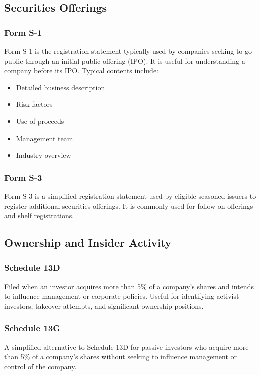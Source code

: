 \documentclass[11pt,a4paper]{report}
\begin{document}
\subsection{Securities Offerings}

\subsubsection{Form S-1}
Form S-1 is the registration statement typically used by companies seeking to go public through an initial public offering (IPO). It is useful for understanding a company before its IPO. Typical contents include:
\begin{itemize}
  \item Detailed business description
  \item Risk factors
  \item Use of proceeds
  \item Management team
  \item Industry overview
\end{itemize}

\subsubsection{Form S-3}
Form S-3 is a simplified registration statement used by eligible seasoned issuers to register additional securities offerings. It is commonly used for follow-on offerings and shelf registrations.


\subsection{Ownership and Insider Activity}

\subsubsection{Schedule 13D}
Filed when an investor acquires more than 5\% of a company's shares and intends to influence management or corporate policies. Useful for identifying activist investors, takeover attempts, and significant ownership positions.

\subsubsection{Schedule 13G}
A simplified alternative to Schedule 13D for passive investors who acquire more than 5\% of a company's shares without seeking to influence management or control of the company.
\end{document}
